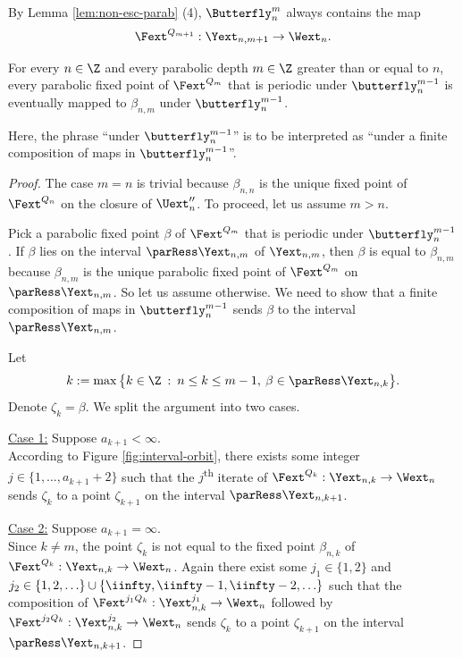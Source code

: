 \documentclass{amsart}
\begin{document}
By Lemma \ref{lem:non-esc-parab} (4), $\Butterfly_n^{m}$ always contains the map 
\[
\Fext^{Q_{m+1}}: \Yext_{n,m+1} \to \Wext_n.
\]

\begin{lemma}
\label{lem:uniqueness-parabolic-cycle}
    For every $n \in \Z$ and every parabolic depth $m \in \Z$ greater than or equal to $n$, 
    every parabolic fixed point of $\Fext^{Q_m}$ that is periodic under $\butterfly_n^{m-1}$ is eventually mapped to $\beta_{n,m}$ under $\butterfly_n^{m-1}$.
\end{lemma}

Here, the phrase ``under $\butterfly_{n}^{m-1}$'' is to be interpreted as ``under a finite composition of maps in $\butterfly_{n}^{m-1}$''.

\begin{proof}
    The case $m=n$ is trivial because $\beta_{n,n}$ is the unique fixed point of $\Fext^{Q_n}$ on the closure of $\Uext''_n$. 
    To proceed, let us assume $m > n$.

    Pick a parabolic fixed point $\beta$ of $\Fext^{Q_m}$ that is periodic under $\butterfly_n^{m-1}$. 
    If $\beta$ lies on the interval $\parRess \Yext_{n,m}$ of $\Yext_{n,m}$, then $\beta$ is equal to $\beta_{n,m}$ because $\beta_{n,m}$ is the unique parabolic fixed point of $\Fext^{Q_m}$ on $\parRess \Yext_{n,m}$. 
    So let us assume otherwise. 
    We need to show that a finite composition of maps in $\butterfly_n^{m-1}$ sends $\beta$ to the interval $\parRess \Yext_{n,m}$. 

    Let 
    \[
        k := \max \big\{ k \in \Z \: : \: n \leq k \leq m-1, \: \beta \in \parRess \Yext_{n,k} \big\}.
    \]
    Denote $\zeta_k = \beta$.
    We split the argument into two cases.
    \vspace{0.1in}
    
    \noindent \underline{Case 1:} Suppose $a_{k+1} < \infty$. \\
    According to Figure \ref{fig:interval-orbit}, there exists some integer $j \in \{1,\ldots,a_{k+1}+2\}$ such that the $j$\textsuperscript{th} iterate of $\Fext^{Q_k}: \Yext_{n,k} \to \Wext_n$ sends $\zeta_k$ to a point $\zeta_{k+1}$ on the interval $\parRess \Yext_{n,k+1}$.
    \vspace{0.1in}
    
    \noindent \underline{Case 2:} Suppose $a_{k+1} = \infty$. \\
    Since $k \neq m$, the point $\zeta_k$ is not equal to the fixed point $\beta_{n,k}$ of $\Fext^{Q_k}: \Yext_{n,k} \to \Wext_n$. 
    Again there exist some $j_1 \in \{1,2\}$ and $j_2 \in \{1,2,\ldots\} \cup \{\iinfty, \iinfty-1,\iinfty-2,\ldots \}$ such that the composition of $\Fext^{j_1 Q_k}: \Yext^{j_1}_{n,k} \to \Wext_n$ followed by $\Fext^{j_2 Q_k} : \Yext^{j_2}_{n,k} \to \Wext_n$ sends $\zeta_k$ to a point $\zeta_{k+1}$ on the interval $\parRess \Yext_{n,k+1}$.
    \vspace{0.1in}


\end{proof}
\end{document}
